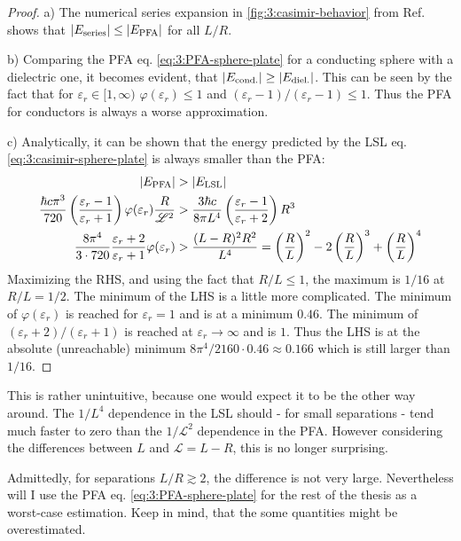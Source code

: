\begin{proof}
  a) The numerical series expansion in \cref{fig:3:casimir-behavior} from Ref. \cite{Emig_2007a} shows that $\left\lvert E_\mathrm{series}\right\rvert \leq \left\lvert E_\mathrm{PFA}\right\rvert$ for all $L/R$.

  b) Comparing the PFA eq. \eqref{eq:3:PFA-sphere-plate} for a conducting sphere with a dielectric one, it becomes evident, that $\left\lvert E_\mathrm{cond.}\right\rvert \geq \left\lvert E_\mathrm{diel.}\right\rvert$. This can be seen by the fact that for $\varepsilon_r \in [1, \infty)$ $\varphi(\varepsilon_r) \leq 1$ and $(\varepsilon_r - 1)/(\varepsilon_r - 1) \leq 1$. Thus the PFA for conductors is always a worse approximation. 

  c) Analytically, it can be shown that the energy predicted by the LSL eq. \eqref{eq:3:casimir-sphere-plate} is always smaller than the PFA:
  \begin{align}
    \left\lvert E_\mathrm{PFA}\right\rvert &> \left\lvert E_\mathrm{LSL}\right\rvert\\
     \frac{\hbar c \pi^3}{720} \left(\frac{\varepsilon_r - 1}{\varepsilon_r + 1}\right)\varphi(\varepsilon_r) \frac{R}{\mathscr{L}^2} &> \frac{3\hbar c}{8 \pi L^4}\left(\frac{\varepsilon_r - 1}{\varepsilon_r + 2}\right) R^3 \\
    \frac{8 \pi^4}{3 \cdot 720} \frac{\varepsilon_r + 2}{\varepsilon_r + 1} \varphi(\varepsilon_r) &> \frac{(L-R)^2 R^2}{L^4} = \left(\frac{R}{L}\right)^2 - 2\left(\frac{R}{L}\right)^3 + \left(\frac{R}{L}\right)^4
  \end{align}
  Maximizing the RHS, and using the fact that $R/L \leq 1$, the maximum is $1/16$ at $R/L=1/2$. The minimum of the LHS is a little more complicated. The minimum of $\varphi(\varepsilon_r)$ is reached for $\varepsilon_r = 1$ and is at a minimum $0.46$. The minimum of $(\varepsilon_r + 2)/(\varepsilon_r + 1)$ is reached at $\varepsilon_r \rightarrow \infty$ and is $1$. Thus the LHS is at the absolute (unreachable) minimum $8\pi^4/2160 \cdot 0.46 \approx 0.166$ which is still larger than $1/16$.
\end{proof}
\begin{remark}
  This is rather unintuitive, because one would expect it to be the other way around. The $1/L^4$ dependence in the LSL should - for small separations - tend much faster to zero than the $1/\mathscr{L}^2$ dependence in the PFA. However considering the differences between $L$ and $\mathscr{L} = L-R$, this is no longer surprising.
\end{remark}
Admittedly, for separations $L/R \gtrsim 2$, the difference is not very large. Nevertheless will I use the PFA eq. \eqref{eq:3:PFA-sphere-plate} for the rest of the thesis as a worst-case estimation. Keep in mind, that the some quantities might be overestimated.
